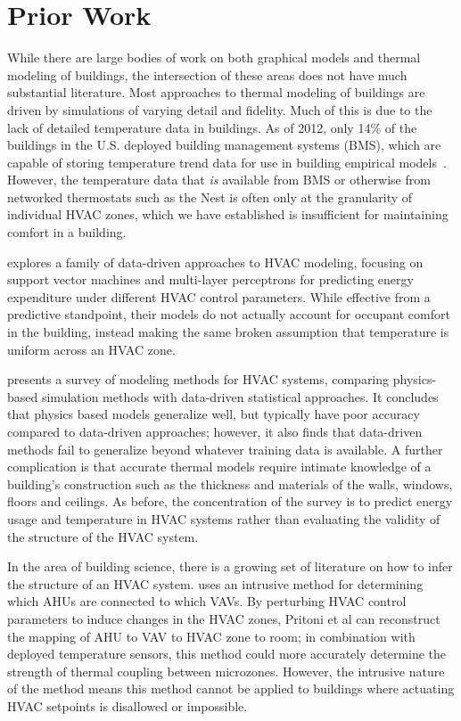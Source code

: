 \section{Prior Work}

While there are large bodies of work on both graphical models and thermal modeling of buildings, the intersection of these areas does not have much substantial literature.
Most approaches to thermal modeling of buildings are driven by simulations of varying detail and fidelity.
Much of this is due to the lack of detailed temperature data in buildings.
As of 2012, only 14\% of the buildings in the U.S. deployed building management systems (BMS), which are capable of storing temperature trend data for use in building empirical models~\cite{cbecs2012}.
However, the temperature data that \emph{is} available from BMS or otherwise from networked thermostats such as the Nest is often only at the granularity of individual HVAC zones, which we have established is insufficient for maintaining comfort in a building.

\cite{kusiak2010modeling} explores a family of data-driven approaches to HVAC modeling, focusing on support vector machines and multi-layer perceptrons for predicting energy expenditure under different HVAC control parameters.
While effective from a predictive standpoint, their models do not actually account for occupant comfort in the building, instead making the same broken assumption that temperature is uniform across an HVAC zone.

\cite{afram2014review} presents a survey of modeling methods for HVAC systems, comparing physics-based simulation methods with data-driven statistical approaches.
It concludes that physics based models generalize well, but typically have poor accuracy compared to data-driven approaches; however, it also finds that data-driven methods fail to generalize beyond whatever training data is available.
A further complication is that accurate thermal models require intimate knowledge of a building's construction such as the thickness and materials of the walls, windows, floors and ceilings.
As before, the concentration of the survey is to predict energy usage and temperature in HVAC systems rather than evaluating the validity of the structure of the HVAC system.

In the area of building science, there is a growing set of literature on how to infer the structure of an HVAC system. \cite{pritoni2015short} uses an intrusive method for determining which AHUs are connected to which VAVs.
By perturbing HVAC control parameters to induce changes in the HVAC zones, Pritoni et al can reconstruct the mapping of AHU to VAV to HVAC zone to room; in combination with deployed temperature sensors, this method could more accurately determine the strength of thermal coupling between microzones.
However, the intrusive nature of the method means this method cannot be applied to buildings where actuating HVAC setpoints is disallowed or impossible.
